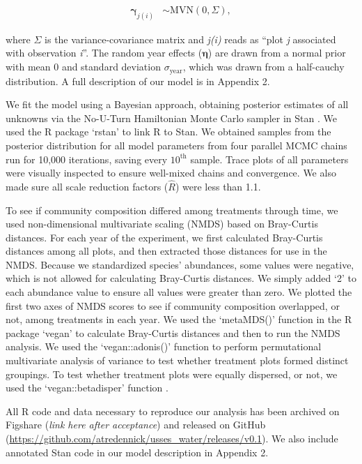 \documentclass[fleqn,10pt,lineno]{wlpeerj} %
\begin{document}
\begin{align}
\boldsymbol{\gamma}_{j(i)} &\sim \text{MVN} \left( 0, \Sigma  \right),
\end{align}

\noindent{}where \(\Sigma\) is the variance-covariance matrix and
\emph{j(i)} reads as ``plot \emph{j} associated with observation
\emph{i}''. The random year effects (\(\boldsymbol{\eta}\)) are drawn
from a normal prior with mean 0 and standard deviation
\(\sigma_{\text{year}}\), which was drawn from a half-cauchy
distribution. A full description of our model is in Appendix 2.

We fit the model using a Bayesian approach, obtaining posterior
estimates of all unknowns via the No-U-Turn Hamiltonian Monte Carlo
sampler in Stan \citep{stan2016}. We used the R package `rstan'
\citep{rstan2016} to link R \citep{R2016} to Stan. We obtained samples
from the posterior distribution for all model parameters from four
parallel MCMC chains run for 10,000 iterations, saving every
\(10^{\text{th}}\) sample. Trace plots of all parameters were visually
inspected to ensure well-mixed chains and convergence. We also made sure
all scale reduction factors (\(\hat{R}\)) were less than 1.1.

To see if community composition differed among treatments through time,
we used non-dimensional multivariate scaling (NMDS) based on Bray-Curtis
distances. For each year of the experiment, we first calculated
Bray-Curtis distances among all plots, and then extracted those
distances for use in the NMDS. Because we standardized species'
abundances, some values were negative, which is not allowed for
calculating Bray-Curtis distances. We simply added `2' to each abundance
value to ensure all values were greater than zero. We plotted the first
two axes of NMDS scores to see if community composition overlapped, or
not, among treatments in each year. We used the `metaMDS()' function in
the R package `vegan' \citep{Oksanen2016} to calculate Bray-Curtis
distances and then to run the NMDS analysis. We used the
`vegan::adonis()' function \citep{Oksanen2016} to perform permutational
multivariate analysis of variance to test whether treatment plots formed
distinct groupings. To test whether treatment plots were equally
dispersed, or not, we used the `vegan::betadisper' function
\citep{Oksanen2016}.

All R code and data necessary to reproduce our analysis has been
archived on Figshare (\emph{link here after acceptance}) and released on
GitHub (\url{https://github.com/atredennick/usses_water/releases/v0.1}).
We also include annotated Stan code in our model description in Appendix
2.
\end{document}
